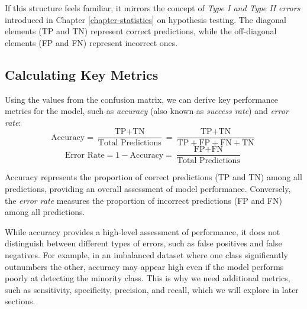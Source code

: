 \documentclass[
]{book}
\theoremstyle{definition}
\theoremstyle{definition}
\theoremstyle{definition}
\theoremstyle{definition}
\theoremstyle{remark}
\begin{document}
If this structure feels familiar, it mirrors the concept of \emph{Type I and Type II errors} introduced in Chapter \ref{chapter-statistics} on hypothesis testing. The diagonal elements (TP and TN) represent correct predictions, while the off-diagonal elements (FP and FN) represent incorrect ones.

\subsection*{Calculating Key Metrics}\label{calculating-key-metrics}

Using the values from the confusion matrix, we can derive key performance metrics for the model, such as \emph{accuracy} (also known as \emph{success rate}) and \emph{error rate}:
\[
\text{Accuracy} = \frac{\text{TP} + \text{TN}}{\text{Total Predictions}} = \frac{\text{TP} + \text{TN}}{\text{TP} + \text{FP} + \text{FN} + \text{TN}}
\]
\[
\text{Error Rate} = 1 - \text{Accuracy} = \frac{\text{FP} + \text{FN}}{\text{Total Predictions}}
\]

Accuracy represents the proportion of correct predictions (TP and TN) among all predictions, providing an overall assessment of model performance. Conversely, the \emph{error rate} measures the proportion of incorrect predictions (FP and FN) among all predictions.

While accuracy provides a high-level assessment of performance, it does not distinguish between different types of errors, such as false positives and false negatives. For example, in an imbalanced dataset where one class significantly outnumbers the other, accuracy may appear high even if the model performs poorly at detecting the minority class. This is why we need additional metrics, such as sensitivity, specificity, precision, and recall, which we will explore in later sections.
\end{document}
